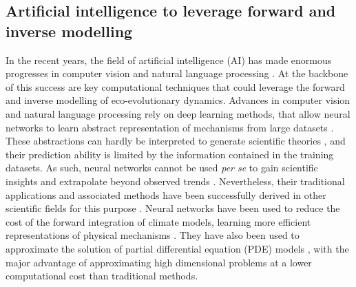 \subsection{Artificial intelligence to leverage forward and inverse modelling}

In the recent years, the field of artificial intelligence (AI) has made enormous progresses in computer vision \citep{voulodimos2018deep} and natural language processing \citep{young2018recent}. At the backbone of this success are key computational techniques that could leverage the forward and inverse modelling of eco-evolutionary dynamics.
% 
% 
% 
% 
% 
Advances in computer vision and natural language processing rely on deep learning methods, that allow neural networks to learn abstract representation of mechanisms from large datasets \citep{LeCun2015}.
% 
These abstractions can hardly be interpreted to generate scientific theories \citep{Karpatne2017}, and their prediction ability is limited by the information contained in the training datasets. As such, neural networks cannot be used \textit{per se} to gain scientific insights and extrapolate beyond observed trends \citep{Barnosky2012,Urban2016}. %
% 
Nevertheless, their traditional applications and associated methods have been successfully derived in other scientific fields for this purpose \citep{Kashinath2021,Schneider2017,Yazdani2020,Rolnick2023}.
%
Neural networks have been used to reduce the cost of the forward integration of climate models, learning more efficient representations of physical mechanisms \citep{Kashinath2021}.
% 
They have also been used to approximate the solution of partial differential equation (PDE) models \citep{Sirignano2018dgm,Han2018}, with the major advantage of approximating high dimensional problems at a lower computational cost than traditional methods.
